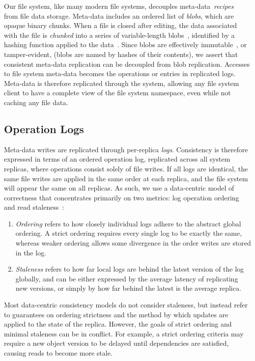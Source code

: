 \documentclass[10pt,conference,letterpaper]{IEEEtran}
\begin{document}
Our file system, like many modern file systems,
decouples
meta-data~\emph{recipes}~\cite{tolia:opportunistic,gfs,shvachko2010hadoop,ross2000pvfs,globalfs}
from file
data storage.
Meta-data includes an ordered list of \emph{blobs}, which are opaque binary chunks.
When a file is closed after editing, the data associated with the file is \emph{chunked} into a
series of variable-length blobs~\cite{lbfs}, identified by a hashing function applied to
the data~\cite{rabin}.
Since blobs are effectively immutable~\cite{helland_immutability_2015}, or tamper-evident, (blobs are named by hashes of
their contents), we assert that consistent meta-data replication can be decoupled from blob
replication.
Accesses to file system meta-data becomes the operations or entries in replicated logs.
Meta-data is therefore replicated through the system, allowing any file
system client to have a complete view of the file system namespace, even while
not caching any file data.

\subsection{Operation Logs}

Meta-data writes are replicated through per-replica \emph{logs}.
Consistency is therefore expressed in terms of an ordered operation log,
replicated across all system replicas, where operations consist solely of file
writes.
If all logs are identical, the same file writes are applied in the same order
at each replica, and the file system will appear the same on all replicas.
As such,
we use a {data-centric} model of correctness that concentrates primarily on
two metrics: log operation ordering and read
staleness~\cite{bermbach_consistency_2013}:
\begin{enumerate}
\item \emph{Ordering} refers to how closely individual logs adhere to the abstract
  global ordering. A strict ordering requires every single log to be exactly the
  same, whereas weaker ordering allows some divergence in the order writes are stored in
  the log.
\item \emph{Staleness} refers to how far local logs are behind the latest version of the log globally,
  and can be either expressed by the average latency of replicating new versions, or
  simply by how far behind the latest is the average replica.
\end{enumerate}

Most data-centric consistency models do not consider staleness, but instead refer to
guarantees on ordering strictness and the method by which updates are applied to the state
of the replica.
However, the goals of strict ordering and minimal staleness can be in conflict. For
example, a strict ordering criteria may require a new object version to be delayed until
dependencies are satisfied, causing reads to become more stale.
\end{document}
